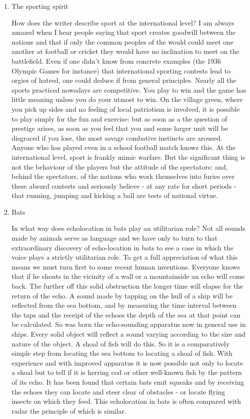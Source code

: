 \begin{enumerate}
\item The sporting spirit

How does the writer describe sport at the international level? I am always amazed when I hear people saying that sport creates goodwill between the nations and that if only the common peoples of the would could meet one another at football or cricket they would have no inclination to meet on the battlefield.
Even if one didn't know from concrete examples (the 1936 Olympic Games for instance) that international sporting contests lead to orgies of hatred, one could deduce if from general principles.
Nearly all the sports practiced nowadays are competitive.
You play to win and the game has little meaning unless you do your utmost to win.
On the village green, where you pick up sides and no feeling of local patriotism is involved, it is possible to play simply for the fun and exercise: but as soon as a the question of prestige arises, as soon as you feel that you and some larger unit will be disgraced if you lose, the most savage combative instincts are aroused.
Anyone who has played even in a school football match knows this.
At the international level, sport is frankly mimic warfare.
But the significant thing is not the behaviour of the players but the attitude of the spectators: and, behind the spectators, of the nations who work themselves into furies over these absurd contests and seriously believe - at any rate for short periods - that running, jumping and kicking a ball are tests of national virtue.

\item  Bats

In what way does echolocation in bats play an utilitarian role? Not all sounds made by animals serve as language and we have only to turn to that extraordinary discovery of echo-location in bats to see a case in which the voice plays a strictly utilitarian role.
To get a full appreciation of what this means we must turn first to some recent human inventions.
Everyone knows that if he shouts in the vicinity of a wall or a mountainside an echo will come back.
The further off this solid obstruction the longer time will elapse for the return of the echo.
A sound made by tapping on the hull of a ship will be reflected from the sea bottom, and by measuring the time interval between the taps and the receipt of the echoes the depth of the sea at that point can be calculated.
So was born the echo-sounding apparatus now in general use in ships.
Every solid object will reflect a sound varying according to the size and nature of the object.
A shoal of fish will do this.
So it is a comparatively simple step from locating the sea bottom to locating a shoal of fish.
With experience and with improved apparatus it is now possible not only to locate a shoal but to tell if it is herring cod or other well-known fish by the pattern of its echo.
It has been found that certain bats emit squeaks and by receiving the echoes they can locate and steer clear of obstacles  - or locate flying insects on which they feed.
This echolocation in bats is often compared with radar the principle of which is similar.



\end{enumerate}
